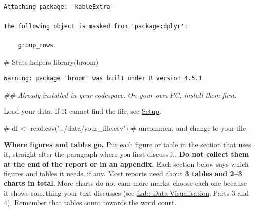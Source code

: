 \documentclass[
  letterpaper,
  DIV=11,
  numbers=noendperiod]{scrreprt}
\newenvironment{Shaded}{\begin{snugshade}}{\end{snugshade}}
\newcommand{\CommentTok}[1]{\textcolor[rgb]{0.37,0.37,0.37}{#1}}
\newcommand{\DocumentationTok}[1]{\textcolor[rgb]{0.37,0.37,0.37}{\textit{#1}}}
\newcommand{\FunctionTok}[1]{\textcolor[rgb]{0.28,0.35,0.67}{#1}}
\newcommand{\NormalTok}[1]{\textcolor[rgb]{0.00,0.23,0.31}{#1}}
\begin{document}
\begin{verbatim}

Attaching package: 'kableExtra'

The following object is masked from 'package:dplyr':

    group_rows
\end{verbatim}

\begin{Shaded}
\begin{Highlighting}[]
\CommentTok{\# Stats helpers}
\FunctionTok{library}\NormalTok{(broom)}
\end{Highlighting}
\end{Shaded}

\begin{verbatim}
Warning: package 'broom' was built under R version 4.5.1
\end{verbatim}

\begin{Shaded}
\begin{Highlighting}[]
\DocumentationTok{\#\# Already installed in your codespace. On your own PC, install them first.}
\end{Highlighting}
\end{Shaded}

Load your data. If R cannot find the file, see
\hyperref[setup-rstudio-in-your-browser]{Setup}.

\begin{Shaded}
\begin{Highlighting}[]
\CommentTok{\# df \textless{}{-} read.csv("../data/your\_file.csv")   \# uncomment and change to your file}
\end{Highlighting}
\end{Shaded}

\begin{tcolorbox}[enhanced jigsaw, arc=.35mm, bottomrule=.15mm, bottomtitle=1mm, breakable, colback=white, colbacktitle=quarto-callout-important-color!10!white, colframe=quarto-callout-important-color-frame, coltitle=black, left=2mm, leftrule=.75mm, opacityback=0, opacitybacktitle=0.6, rightrule=.15mm, title=\textcolor{quarto-callout-important-color}{\faExclamation}\hspace{0.5em}{Important}, titlerule=0mm, toprule=.15mm, toptitle=1mm]

\textbf{Where figures and tables go.} Put each figure or table in the
section that uses it, straight after the paragraph where you first
discuss it. \textbf{Do not collect them at the end of the report or in
an appendix.} Each section below says which figures and tables it needs,
if any. Most reports need about \textbf{3 tables and 2--3 charts in
total}. More charts do not earn more marks: choose each one because it
shows something your text discusses (see
\href{../labs/05.Visualisation.qmd}{Lab: Data Visualisation}, Parts 3
and 4). Remember that tables count towards the word count.

\end{tcolorbox}
\end{document}

